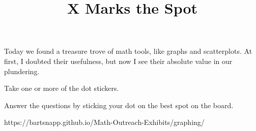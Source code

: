 \documentclass{../exhibit}
\title{X Marks the Spot}
\begin{document}
\begin{context} Today we found a treasure trove of math tools, like
graphs and scatterplots. At first, I doubted their usefulness, but now I see their absolute value in
our plundering.
\end{context}

\begin{directions}
Take one or more of the dot stickers.
  
Answer the questions by sticking your dot on the best spot on the board.
\end{directions}

\begin{example}
\end{example}

\begin{mathConnections}
  https://bartsnapp.github.io/Math-Outreach-Exhibits/graphing/
\end{mathConnections}
\end{document}
